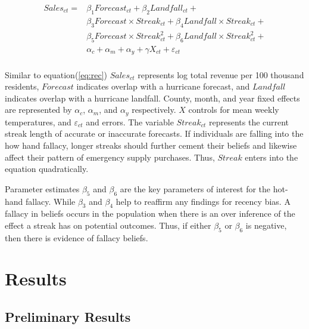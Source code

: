 \documentclass{article}
\begin{document}
\begin{equation}
    \begin{split}
       Sales_{ct} = &\beta_1 Forecast_{ct} + \beta_2 Landfall_{ct} +\\ 
			&\beta_3 Forecast \times Streak_{ct} + \beta_4 Landfall \times Streak_{ct} + \\
			&\beta_5 Forecast \times Streak^2_{ct} + \beta_6 Landfall \times Streak^2_{ct} + \\
			& \alpha_c + \alpha_m + \alpha_y + \gamma X_{ct} + \varepsilon_{ct}\\
			\label{eq:hot}
    \end{split}
\end{equation}

Similar to equation(\ref{eq:rec}) $Sales_{ct}$ represents log total revenue per 100 thousand residents, $Forecast$ indicates overlap with a hurricane forecast, and $Landfall$ indicates overlap with a hurricane landfall.  County, month, and year fixed effects are represented by $\alpha_c$, $\alpha_m$, and $\alpha_y$ respectively. $X$ controls for mean weekly temperatures, and $\varepsilon_{ct}$ and errors. The variable $Streak_{ct}$ represents the current streak length of accurate or inaccurate forecasts. If individuals are falling into the how hand fallacy, longer streaks should further cement their beliefs and likewise affect their pattern of emergency supply purchases. Thus, $Streak$ enters into the equation quadratically. 

Parameter estimates $\beta_5$ and $\beta_6$ are the key parameters of interest for the hot-hand fallacy. While $\beta_3$ and $\beta_4$ help to reaffirm any findings for recency bias. A fallacy in beliefs occurs in the population when there is an over inference of the effect a streak has on potential outcomes. Thus, if either $\beta_5$ or $\beta_6$ is negative, then there is evidence of fallacy beliefs.

\section{Results}
\subsection{Preliminary Results}
\end{document}
